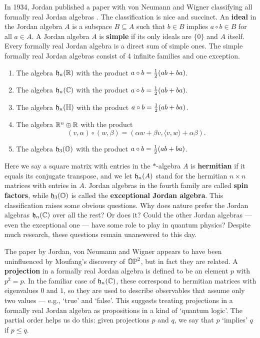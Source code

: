 In 1934, Jordan published a paper with von Neumann and Wigner  
classifying all formally real Jordan algebras \cite{JNW}.  The 
classification is nice and succinct.  An {\bf ideal} in the Jordan algebra 
$A$ is a subspace $B \subseteq A$ such that $b \in B$ implies $a \circ b 
\in B$ for all $a \in A$.  A Jordan algebra $A$ is {\bf simple} if its 
only ideals are $\{0\}$ and $A$ itself.  Every formally real Jordan 
algebra is a direct sum of simple ones.  The simple formally real Jordan 
algebras consist of 4 infinite families and one exception.   
\begin{enumerate} 
\item The algebra ${\mathfrak {h}}_n({\mathbb R})$  
with the product $a \circ b = {1\over 2}(ab + ba)$.   
\item The algebra ${\mathfrak {h}}_n({\mathbb C})$  
with the product $a \circ b = {1\over 2}(ab + ba)$.   
\item The algebra ${\mathfrak {h}}_n({\mathbb H})$  
with the product $a \circ b = {1\over 2}(ab + ba)$.   
\item The algebra ${\mathbb R}^n \oplus {\mathbb R}$ with the product  
\[  (v,\alpha) \circ (w, \beta) =  
(\alpha w + \beta v, \langle v,w\rangle + \alpha \beta).  \] 
\item The algebra ${\mathfrak {h}}_3({\mathbb O})$  
with the product $a \circ b = {1\over 2}(ab + ba)$.   
\end{enumerate} 
Here we say a square matrix with entries in the $\ast$-algebra $A$ is 
{\bf hermitian} if it equals its conjugate transpose, and we let 
${\mathfrak {h}}_n(A)$ stand for the hermitian $n \times n$ matrices with entries in 
$A$.  Jordan algebras in the fourth family are called {\bf spin 
factors}, while ${\mathfrak {h}}_3({\mathbb O})$ is called the {\bf exceptional Jordan 
algebra}.  This classification raises some obvious questions.  Why does 
nature prefer the Jordan algebras ${\mathfrak {h}}_n({\mathbb C})$ over all the rest?  Or does 
it?  Could the other Jordan algebras --- even the exceptional one --- 
have some role to play in quantum physics?  Despite much research, these 
questions remain unanswered to this day. 
 
The paper by Jordan, von Neumann and Wigner appears to have been 
uninfluenced by Moufang's discovery of ${\mathbb {OP}}^2$, but in fact they are 
related.  A {\bf projection} in a formally real Jordan algebra is 
defined to be an element $p$ with $p^2 = p$.  In the familiar case of 
${\mathfrak {h}}_n({\mathbb C})$, these correspond to hermitian matrices with eigenvalues $0$ 
and $1$, so they are used to describe observables that assume only two 
values --- e.g., `true' and `false'.  This suggests treating projections 
in a formally real Jordan algebra as propositions in a kind of `quantum 
logic'.  The partial order helps us do this: given projections $p$ and 
$q$, we say that $p$ `implies' $q$ if $p \le q$.    
 
